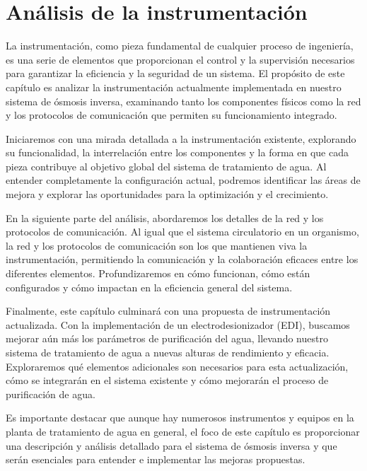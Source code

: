 \chapter{Análisis de la instrumentación}

La instrumentación, como pieza fundamental de cualquier proceso de ingeniería, es una serie de
elementos que proporcionan el control y la supervisión necesarios para garantizar la eficiencia y la
seguridad de un sistema. El propósito de este capítulo es analizar la instrumentación actualmente
implementada en nuestro sistema de ósmosis inversa, examinando tanto los componentes físicos
como la red y los protocolos de comunicación que permiten su funcionamiento integrado.

Iniciaremos con una mirada detallada a la instrumentación existente, explorando su funcionalidad,
la interrelación entre los componentes y la forma en que cada pieza contribuye al objetivo global del
sistema de tratamiento de agua. Al entender completamente la configuración actual, podremos identificar
las áreas de mejora y explorar las oportunidades para la optimización y el crecimiento.

En la siguiente parte del análisis, abordaremos los detalles de la red y los protocolos de
comunicación. Al igual que el sistema circulatorio en un organismo, la red y los protocolos de
comunicación son los que mantienen viva la instrumentación, permitiendo la comunicación y la colaboración
eficaces entre los diferentes elementos. Profundizaremos en cómo funcionan, cómo están configurados y
cómo impactan en la eficiencia general del sistema.

Finalmente, este capítulo culminará con una propuesta de instrumentación actualizada. Con la
implementación de un electrodesionizador (EDI), buscamos mejorar aún más los parámetros de purificación del agua,
llevando nuestro sistema de tratamiento de agua a nuevas alturas de rendimiento y eficacia. Exploraremos qué
elementos adicionales son necesarios para esta actualización, cómo se integrarán en el sistema existente y cómo
mejorarán el proceso de purificación de agua.

Es importante destacar que aunque hay numerosos instrumentos y equipos en la planta de tratamiento de agua en general,
el foco de este capítulo es proporcionar una descripción y análisis detallado  para el sistema
de ósmosis inversa y que serán esenciales para entender e implementar las mejoras propuestas.






